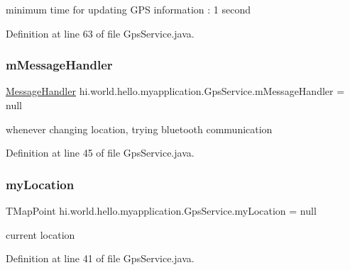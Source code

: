 minimum time for updating G\+PS information \+: 1 second 



Definition at line 63 of file Gps\+Service.\+java.

\mbox{\label{classhi_1_1world_1_1hello_1_1myapplication_1_1_gps_service_ac8f9736807f14bf24d2a78dc018f84ba}} 
\subsubsection{\texorpdfstring{mMessageHandler}{mMessageHandler}}
{\footnotesize\ttfamily \mbox{\hyperlink{classhi_1_1world_1_1hello_1_1myapplication_1_1_message_handler}{Message\+Handler}} hi.\+world.\+hello.\+myapplication.\+Gps\+Service.\+m\+Message\+Handler = null\hspace{0.3cm}{\ttfamily [private]}}



whenever changing location, trying bluetooth communication 



Definition at line 45 of file Gps\+Service.\+java.

\mbox{\label{classhi_1_1world_1_1hello_1_1myapplication_1_1_gps_service_af2635a5ffa3c883e90ba210c828a10f4}} 
\subsubsection{\texorpdfstring{myLocation}{myLocation}}
{\footnotesize\ttfamily T\+Map\+Point hi.\+world.\+hello.\+myapplication.\+Gps\+Service.\+my\+Location = null\hspace{0.3cm}{\ttfamily [private]}}



current location 



Definition at line 41 of file Gps\+Service.\+java.

